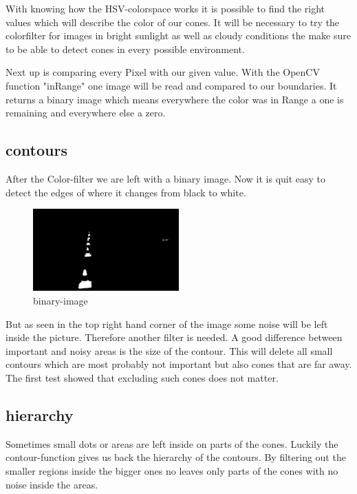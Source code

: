 \documentclass[10pt,a4paper]{article}
\begin{document}
	With knowing how the HSV-colorspace works it is possible to find the right values which will describe the color of our cones. It will be necessary to try the colorfilter for images in bright sunlight as well as cloudy conditions the make sure to be able to detect cones in every possible environment.
	
	Next up is comparing every Pixel with our given value. With the OpenCV function "inRange" one image will be read and compared to our boundaries. It returns a binary image which means everywhere the color was in Range a one is remaining and everywhere else a zero.
	
	\subsection{contours}
	After the Color-filter we are left with a binary image. Now it is quit easy to detect the edges of where it changes from black to white.
	
	\begin{figure}[h]
		\centering
		\includegraphics[width=0.5\textwidth]{Abb/mask.png}
		\caption{binary-image}
		\label{binary-image}
	\end{figure}
	
	But as seen in the top right hand corner of the image some noise will be left inside the picture. Therefore another filter is needed. A good difference between important and noisy areas is the size of the contour. This will delete all small contours which are most probably not important but also cones that are far away. The first test showed that excluding such cones does not matter.
	
	\subsection{hierarchy}
	Sometimes small dots or areas are left inside on parts of the cones. Luckily the contour-function gives us back the hierarchy of the contours. By filtering out the smaller regions inside the bigger ones no leaves only parts of the cones with no noise inside the areas.
	
\end{document}
